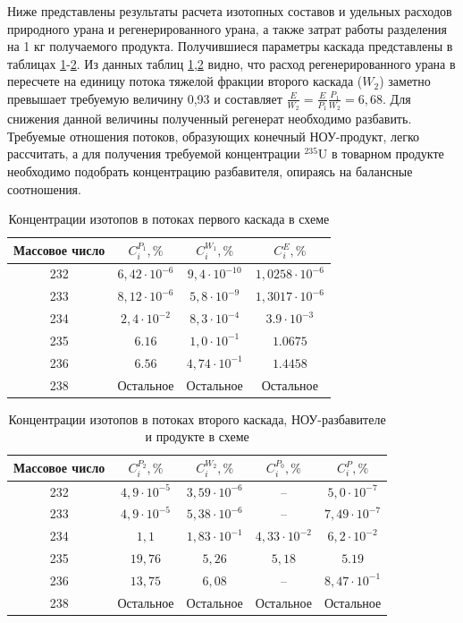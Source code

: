 Ниже представлены результаты расчета изотопных составов и удельных расходов природного урана и регенерированного урана, а также затрат работы разделения на 1 кг получаемого продукта. Получившиеся параметры каскада представлены в таблицах \ref{MDKcas1params}-\ref{MDKcas2params}. Из данных таблиц \ref{MDKcas1params},\ref{MDKcas2params} видно, что расход регенерированного урана в пересчете на единицу потока тяжелой фракции второго каскада ($W_{2}$) заметно превышает требуемую величину 0,93 и составляет $\frac{E}{W_{2}}=\frac{E}{P_{1}} \frac{P_{1}}{W_{2}}=6,68$. Для снижения данной величины полученный регенерат необходимо разбавить. Требуемые отношения потоков, образующих конечный НОУ-продукт, легко рассчитать, а для получения требуемой концентрации $^{235}$U в товарном продукте необходимо подобрать концентрацию разбавителя, опираясь на балансные соотношения.


\begin{table}
\begin{tabular}{|c|c|c|c|}
    \hline Массовое число & $C_{i}^{P_{1}}, \%$ & $C_{i}^{W_{1}}, \%$ & $C_{i}^{E}, \%$\\
    \hline 232 & $6,42\cdot10^{-6}$ & $9,4\cdot10^{-10}$ & $1,0258\cdot10^{-6}$\\
    233 & $8,12\cdot10^{-6}$ & $5,8\cdot10^{-9}$ & $1,3017\cdot10^{-6}$\\
    234 & $2,4\cdot10^{-2}$ & $8,3\cdot10^{-4}$ & $3.9\cdot10^{-3}$\\
    235 & $6.16$ & $1,0\cdot10^{-1}$ & $1.0675$\\
    236 & $6.56$ & $4,74\cdot10^{-1}$ & $1.4458$\\
    238 & Остальное & Остальное & Остальное\\
    \hline
\end{tabular}
\caption{Концентрации изотопов в потоках первого каскада в схеме}\label{MDKcas1params}
\end{table}

\begin{table}
    \begin{tabular}{|c|c|c|c|c|}
        \hline Массовое число & $C_{i}^{P_{2}}, \%$ & $C_{i}^{W_{2}}, \%$ & $C_{i}^{P_{0}}, \%$ & $C_{i}^{P}, \%$\\
        \hline 232 & $4,9\cdot10^{-5}$ & $3,59\cdot10^{-6}$ & -- & $5,0\cdot10^{-7}$\\
        233 & $4,9\cdot10^{-5}$ & $5,38\cdot10^{-6}$ & -- & $7,49\cdot10^{-7}$\\
        234 & $1,1$ & $1,83\cdot10^{-1}$ & $4,33\cdot10^{-2}$ & $6,2\cdot10^{-2}$\\
        235 & $19,76$ & $5,26$ & $5,18$  & $5.19$\\
        236 & $13,75$ & $6,08$ & --  & $8,47\cdot10^{-1}$\\
        238 & Остальное & Остальное & Остальное  & Остальное\\
        \hline
    \end{tabular}
    \caption{Концентрации изотопов в потоках второго каскада, НОУ-разбавителе и продукте в схеме}\label{MDKcas2params}
    \end{table}



